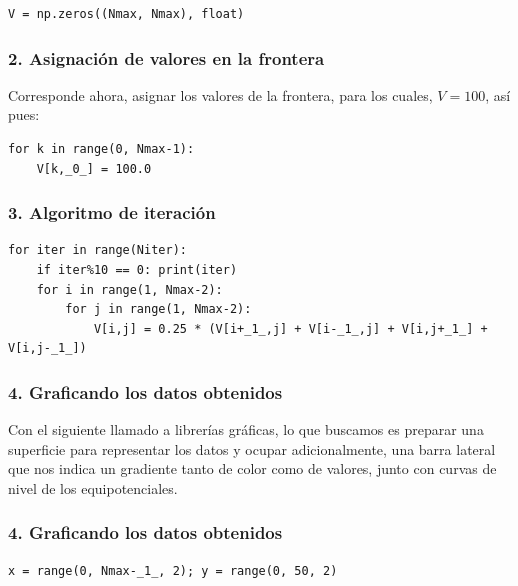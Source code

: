 {\begin{frame}[fragile]
\begin{lstlisting}[caption=Construyendo la malla, style=FormattedNumber, basicstyle=\linespread{1.1}\ttfamily=\small, columns=fullflexible]
V = np.zeros((Nmax, Nmax), float)
\end{lstlisting}
\end{frame}
\begin{frame}[fragile]
\frametitle{2. Asignación de valores en la frontera}
Corresponde ahora, asignar los valores de la frontera, para los cuales, $V=100$, así pues:
\begin{lstlisting}[caption=Asignando los valores iniciales, style=FormattedNumber, basicstyle=\linespread{1.1}\ttfamily=\small, columns=fullflexible]
for k in range(0, Nmax-1):
    V[k,_0_] = 100.0
\end{lstlisting}
\end{frame}
\begin{frame}
\frametitle{3. Algoritmo de iteración}
\begin{lstlisting}[caption=Iteración en los puntos, style=FormattedNumber, basicstyle=\linespread{1.1}\ttfamily=\small, columns=fullflexible]
for iter in range(Niter):
    if iter%10 == 0: print(iter)
    for i in range(1, Nmax-2):
        for j in range(1, Nmax-2):
            V[i,j] = 0.25 * (V[i+_1_,j] + V[i-_1_,j] + V[i,j+_1_] + V[i,j-_1_])
\end{lstlisting}
\end{frame}
\begin{frame}[fragile]
\frametitle{4. Graficando los datos obtenidos}
Con el siguiente llamado a librerías gráficas, lo que buscamos es preparar una superficie para representar los datos y ocupar adicionalmente, una barra lateral que nos indica un gradiente tanto de color como de valores, junto con curvas de nivel de los equipotenciales.
\end{frame}
\begin{frame}
\frametitle{4. Graficando los datos obtenidos}
\begin{lstlisting}[caption=Graficando la solución, style=FormattedNumber, basicstyle=\linespread{1.1}\ttfamily=\small, columns=fullflexible]
x = range(0, Nmax-_1_, 2); y = range(0, 50, 2)


\end{lstlisting}
\end{frame}}

